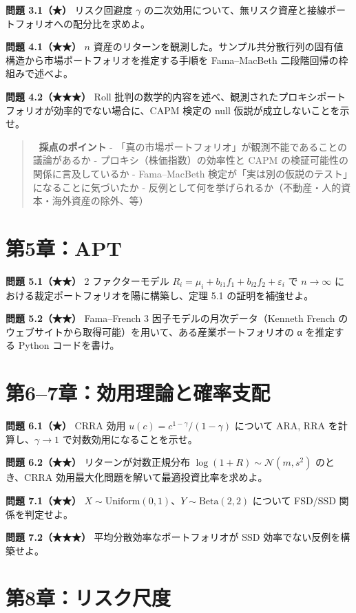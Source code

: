 \documentclass[11pt,a4paper]{report}
\begin{document}
\textbf{問題 3.1（★）} リスク回避度 $\gamma$ の二次効用について、無リスク資産と接線ポートフォリオへの配分比を求めよ。

\textbf{問題 4.1（★★）} $n$ 資産のリターンを観測した。サンプル共分散行列の固有値構造から市場ポートフォリオを推定する手順を Fama–MacBeth 二段階回帰の枠組みで述べよ。

\textbf{問題 4.2（★★★）} Roll 批判の数学的内容を述べ、観測されたプロキシポートフォリオが効率的でない場合に、CAPM 検定の null 仮説が成立しないことを示せ。

\begin{quote}
📝 \textbf{採点のポイント}
- 「真の市場ポートフォリオ」が観測不能であることの議論があるか
- プロキシ（株価指数）の効率性と CAPM の検証可能性の関係に言及しているか
- Fama–MacBeth 検定が「実は別の仮説のテスト」になることに気づいたか
- 反例として何を挙げられるか（不動産・人的資本・海外資産の除外、等）
\end{quote}

\section{第5章：APT}

\textbf{問題 5.1（★★）} 2 ファクターモデル $R_i = \mu_i + b_{i1} f_1 + b_{i2} f_2 + \varepsilon_i$ で $n \to \infty$ における裁定ポートフォリオを陽に構築し、定理 5.1 の証明を補強せよ。

\textbf{問題 5.2（★★）} Fama–French 3 因子モデルの月次データ（Kenneth French のウェブサイトから取得可能）を用いて、ある産業ポートフォリオの α を推定する Python コードを書け。

\section{第6–7章：効用理論と確率支配}

\textbf{問題 6.1（★）} CRRA 効用 $u(c) = c^{1-\gamma}/(1-\gamma)$ について ARA, RRA を計算し、$\gamma \to 1$ で対数効用になることを示せ。

\textbf{問題 6.2（★★）} リターンが対数正規分布 $\log(1 + R) \sim \mathcal{N}(m, s^2)$ のとき、CRRA 効用最大化問題を解いて最適投資比率を求めよ。

\textbf{問題 7.1（★★）} $X \sim \mathrm{Uniform}(0,1)$、$Y \sim \mathrm{Beta}(2, 2)$ について FSD/SSD 関係を判定せよ。

\textbf{問題 7.2（★★★）} 平均分散効率なポートフォリオが SSD 効率でない反例を構築せよ。

\section{第8章：リスク尺度}
\end{document}
